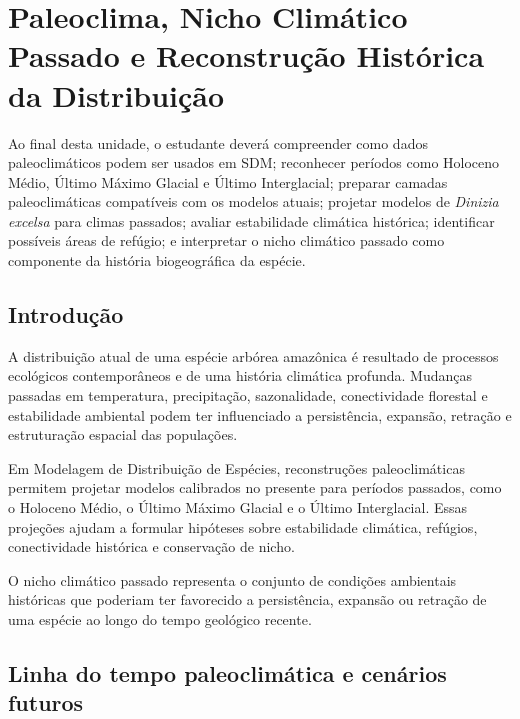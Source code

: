 \chapter[Paleoclima e nicho climático passado]{Paleoclima, Nicho Climático Passado e Reconstrução Histórica da Distribuição}

\begin{objetivos}
	Ao final desta unidade, o estudante deverá compreender como dados paleoclimáticos podem ser usados em SDM; reconhecer períodos como Holoceno Médio, Último Máximo Glacial e Último Interglacial; preparar camadas paleoclimáticas compatíveis com os modelos atuais; projetar modelos de \textit{Dinizia excelsa} para climas passados; avaliar estabilidade climática histórica; identificar possíveis áreas de refúgio; e interpretar o nicho climático passado como componente da história biogeográfica da espécie.
\end{objetivos}

\section{Introdução}

A distribuição atual de uma espécie arbórea amazônica é resultado de processos ecológicos contemporâneos e de uma história climática profunda. Mudanças passadas em temperatura, precipitação, sazonalidade, conectividade florestal e estabilidade ambiental podem ter influenciado a persistência, expansão, retração e estruturação espacial das populações.

Em Modelagem de Distribuição de Espécies, reconstruções paleoclimáticas permitem projetar modelos calibrados no presente para períodos passados, como o Holoceno Médio, o Último Máximo Glacial e o Último Interglacial. Essas projeções ajudam a formular hipóteses sobre estabilidade climática, refúgios, conectividade histórica e conservação de nicho.

\begin{conceito}[title={\faBook\quad Nicho climático passado}]
	O nicho climático passado representa o conjunto de condições ambientais históricas que poderiam ter favorecido a persistência, expansão ou retração de uma espécie ao longo do tempo geológico recente.
\end{conceito}

\section{Linha do tempo paleoclimática e cenários futuros}

